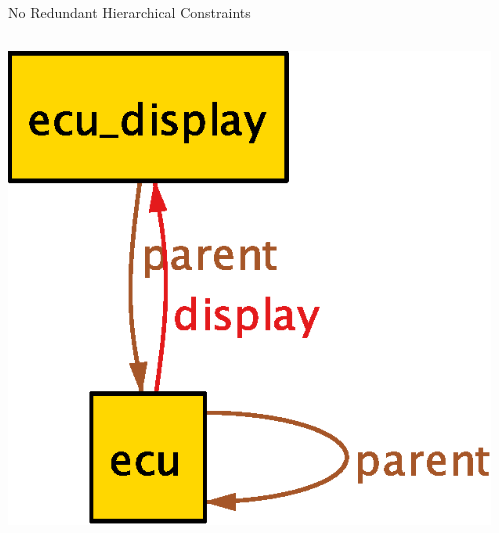 \documentclass[table,15pt,t]{beamer}
\newcounter{i}
\begin{document}
\begin{frame}{No Redundant Hierarchical Constraints} %
  \begin{columns}
    \begin{column}{0.5\textwidth}
      \includegraphics[scale=0.5]{figs/parent-old}
    \end{column}
\pause
    \begin{column}{0.5\textwidth}

\end{column}
\end{columns}
\end{frame}
\end{document}

